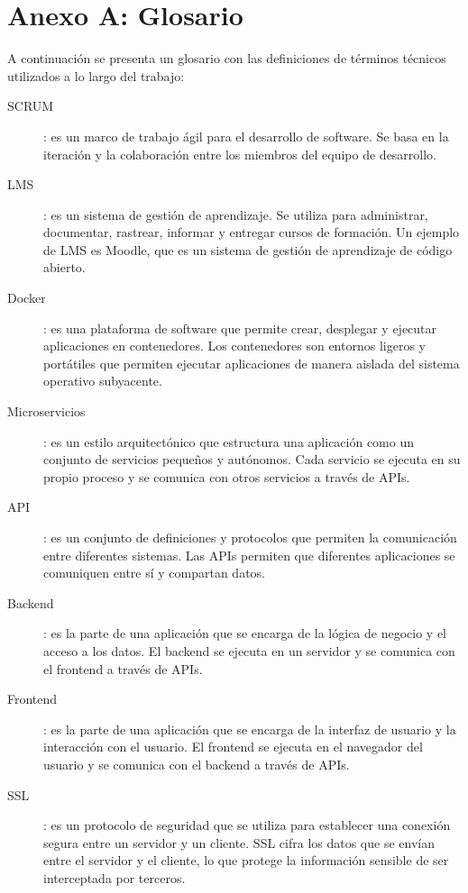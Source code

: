 \chapter*{Anexo A: Glosario}

A continuación se presenta un glosario con las definiciones de términos técnicos utilizados a lo largo del trabajo:

\begin{description}
    \item [\hypertarget{scrum}{SCRUM}]: es un marco de trabajo ágil para el desarrollo de software. Se basa en la iteración y la colaboración entre los miembros del equipo de desarrollo.
    \item [\hypertarget{lms}{LMS}]: es un sistema de gestión de aprendizaje. Se utiliza para administrar, documentar, rastrear, informar y entregar cursos de formación. Un ejemplo de LMS es Moodle, que es un sistema de gestión de aprendizaje de código abierto.
    \item [\hypertarget{docker}{Docker}]: es una plataforma de software que permite crear, desplegar y ejecutar aplicaciones en contenedores. Los contenedores son entornos ligeros y portátiles que permiten ejecutar aplicaciones de manera aislada del sistema operativo subyacente.
    \item [\hypertarget{microservicios}{Microservicios}]: es un estilo arquitectónico que estructura una aplicación como un conjunto de servicios pequeños y autónomos. Cada servicio se ejecuta en su propio proceso y se comunica con otros servicios a través de APIs.
    \item [\hypertarget{api}{API}]: es un conjunto de definiciones y protocolos que permiten la comunicación entre diferentes sistemas. Las APIs permiten que diferentes aplicaciones se comuniquen entre sí y compartan datos.
    \item [\hypertarget{backend}{Backend}]: es la parte de una aplicación que se encarga de la lógica de negocio y el acceso a los datos. El backend se ejecuta en un servidor y se comunica con el frontend a través de APIs.
    \item [\hypertarget{frontend}{Frontend}]: es la parte de una aplicación que se encarga de la interfaz de usuario y la interacción con el usuario. El frontend se ejecuta en el navegador del usuario y se comunica con el backend a través de APIs.
    \item [\hypertarget{ssl}{SSL}]: es un protocolo de seguridad que se utiliza para establecer una conexión segura entre un servidor y un cliente. SSL cifra los datos que se envían entre el servidor y el cliente, lo que protege la información sensible de ser interceptada por terceros.

\end{description}
